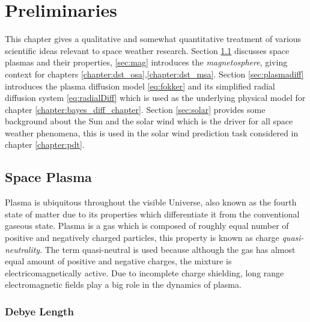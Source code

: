\chapter{Preliminaries}\label{chapter:preliminaries}

This chapter gives a qualitative and somewhat quantitative treatment of various scientific ideas 
relevant to space weather research. Section \ref{sec:plasma} discusses space plasmas and their properties, 
\ref{sec:mag} introduces the \emph{magnetosphere}, giving context for chapters \ref{chapter:dst_osa},\ref{chapter:dst_msa}. 
Section \ref{sec:plasmadiff} introduces the plasma diffusion model \ref{eq:fokker} and its simplified 
radial diffusion system \ref{eq:radialDiff} which is used as the underlying physical model for chapter 
\ref{chapter:bayes_diff_chapter}. Section \ref{sec:solar} provides some background about the Sun and 
the solar wind which is the driver for all space weather phenomena, this is used in the solar wind prediction 
task considered in chapter \ref{chapter:pdt}.    

\section{Space Plasma}\label{sec:plasma}

Plasma is ubiquitous throughout the visible Universe, also known as the fourth state of matter 
due to its properties which differentiate it from the conventional gaseous state. Plasma is a 
gas which is composed of roughly equal number of positive and negatively charged particles, this
property is known as charge \emph{quasi-neutrality}. The term quasi-neutral is used because although
the gas has almost equal amount of positive and negative charges, the mixture is electricomagnetically 
active. Due to incomplete charge shielding, long range electromagnetic fields play a big role in the 
dynamics of plasma.




\subsection*{Debye Length}

